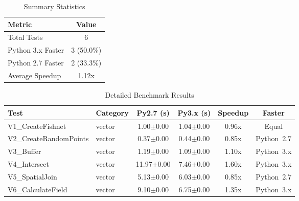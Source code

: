 
\begin{table}[htbp]
\centering
\caption{Summary Statistics}
\begin{tabular}{lc}
\hline
\textbf{Metric} & \textbf{Value} \\
\hline
Total Tests & 6 \\
Python 3.x Faster & 3 (50.0\%) \\
Python 2.7 Faster & 2 (33.3\%) \\
Average Speedup & 1.12x \\
\hline
\end{tabular}
\label{tab:summary_stats}
\end{table}

\begin{table}[htbp]
\centering
\caption{Detailed Benchmark Results}
\begin{tabular}{llcccc}
\hline
\textbf{Test} & \textbf{Category} & \textbf{Py2.7 (s)} & \textbf{Py3.x (s)} & \textbf{Speedup} & \textbf{Faster} \\
\hline
V1\_CreateFishnet & vector & 1.00$\pm$0.00 & 1.04$\pm$0.00 & 0.96x & Equal \\
V2\_CreateRandomPoints & vector & 0.37$\pm$0.00 & 0.44$\pm$0.00 & 0.85x & Python\ 2.7 \\
V3\_Buffer & vector & 1.19$\pm$0.00 & 1.09$\pm$0.00 & 1.10x & Python\ 3.x \\
V4\_Intersect & vector & 11.97$\pm$0.00 & 7.46$\pm$0.00 & 1.60x & Python\ 3.x \\
V5\_SpatialJoin & vector & 5.13$\pm$0.00 & 6.03$\pm$0.00 & 0.85x & Python\ 2.7 \\
V6\_CalculateField & vector & 9.10$\pm$0.00 & 6.75$\pm$0.00 & 1.35x & Python\ 3.x \\
\hline
\end{tabular}
\label{tab:detailed_results}
\end{table}